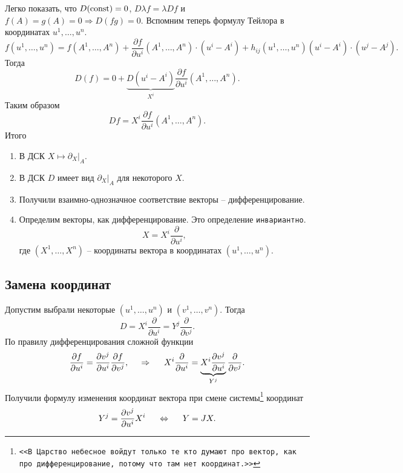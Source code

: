 Легко показать, что $D (\text{const} )= 0$, $D \lambda f = \lambda D f$ и $f(A)=g(A)=0 \Rightarrow D(fg)=0$. Вспомним теперь формулу Тейлора в координатах $u^1, \ldots, u^n$.
$$
    f(u^1, \ldots, u^n) = f(A^1, \ldots, A^n)
    +
    \frac{\partial f}{\partial u^i} (A^1, \ldots, A^n) \cdot (u^i - A^i)
    +
    h_{ij} (u^1, \ldots, u^n) (u^i - A^i) \cdot (u^j - A^j).
$$
Тогда
\begin{equation*}
    D(f) = 0 + \underbrace{D(u^i - A^i) }_{X^i}
    \frac{\partial f}{\partial u^i}(A^1, \ldots, A^n).
\end{equation*}
Таким образом
\begin{equation}
    Df = X^i \frac{\partial f}{\partial u^i} \left(A^1, \ldots, A^n\right).
\end{equation}
Итого
\begin{enumerate}
    \item В ДСК $X \mapsto \partial_X \big|_A$.
    \item В ДСК $D$ имеет вид $\partial_X \big|_A$ для некоторого $X$.
    \item Получили взаимно-однозначное соответствие векторы -- дифференцирование.
    \item Определим векторы, как дифференцирование. Это определение 
    \texttt{инвариантно}.
    \begin{equation}
        X = X^i \frac{\partial }{\partial u^i},
    \end{equation}
    где $(X^1, \ldots, X^n)$ -- координаты вектора в координатах $(u^1, \ldots, u^n)$.
\end{enumerate}


\subsection{Замена координат}
Допустим выбрали некоторые $(u^1, \ldots, u^n)$ и $(v^1, \ldots, v^n)$.
Тогда
$$
    D = X^i \frac{\partial }{\partial u^i} = Y^j \frac{\partial }{\partial v^j}.
$$
По правилу дифференцирования сложной функции
$$
    \frac{\partial f}{\partial u^i} = \frac{\partial v^j}{\partial u^i} \frac{\partial f}{\partial v^j},
    \hspace{0.5cm} \Rightarrow \hspace{0.5cm} 
    X^i \frac{\partial }{\partial u^i} = 
    \underbrace{X^i \frac{\partial v^j}{\partial u^i} }_{Y^j}
    \frac{\partial }{\partial v^j} .
$$
Получили формулу изменения координат вектора при смене системы\footnote{
    \texttt{<<В Царство небесное войдут только те кто думают про вектор, как про дифференцирование, потому что там нет координат.>>}
} координат
\begin{equation}
    Y^j = \frac{\partial v^j}{\partial u^i} X^i
    \hspace{0.5cm} \Leftrightarrow \hspace{0.5cm} 
    Y = J X.
\end{equation}



